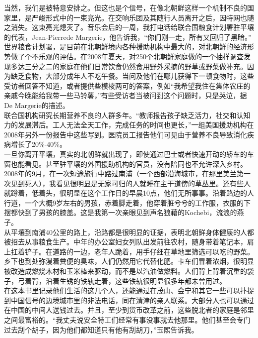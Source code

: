 当然，我们是被特意安排之。但这也是个信号，在像北朝鲜这样一个机制不良的国家里，是严峻形式中的一束亮光。在交响乐团及其随行人员离开之后，因特网也随之消失。这束亮光熄灭了。音乐会后的一周，我打电话给联合国粮食计划署驻平壤的代表，Jean-Pierrede Margerie，他告诉我，“你们刚一走，所有又回归了黑暗。”\\

世界粮食计划署，是目前在北朝鲜境内各种援助机构中最大的，对北朝鲜的经济形势做了个不乐观的评估。在2008年夏天，对250个北朝鲜家庭做的一个抽样调查发现多达三分之二的家庭在他们日常饮食仍然食用野外采摘的野草或野菜做补充。因为缺乏食物，大部分成年人不吃午餐。当问及他们在哪儿获得下一顿食物时，这些受访者回答不知道，或者提供些模棱两可的答案，例如“我希望我住在集体农庄的亲戚今晚能给我带一些马铃薯，”有些受访者当被问到这个问题时，只是哭泣，据De Margerie的描述。\\

联合国机构研究长期营养不良的人群多年。“教师报告孩子缺乏活力，社交和认知力的发展滞后。工人无法全天工作，完成任务的时间也更长，”一组美国援助机构在2008年另外一份报告中这些写到。医院员工报告他们可见由于营养不良导致消化疾病增长了20\%-40\%。\\

一旦你离开平壤，真实的北朝鲜就出现了，即使通过巴士或者快速开动的轿车的车窗也能看见。甚至驻平壤的外国援助机构的官员，没有陪同也不允许深入乡村。2008年的9月，在一次短途旅行中路过南浦（一个西部沿海城市，在那里美兰第一次见到死人），我看见很明显是无家可归的人就睡在主干道傍的草丛里。还有些人就蹲着，低着头，很明显在这个工作日的早晨10点，他们无所事事。沿着路边的人行道，一个大概9岁左右的男孩，赤着脚走着，他穿着脏兮兮的工作服，衣服的下摆都快到了男孩的膝盖。这是我第一次亲眼见到声名狼藉的Kochebi，流浪的燕子。\\

从平壤到南浦40公里的路上，沿路都是很明显的证据，表明北朝鲜身体健康的人都被招去从事粮食生产。中年的办公室妇女列队出发前往农村，随身带着笔记本，肩上扛着铲子。在道路的一边，老年人跪着，用手仔细在草地里筛选可以吃的野菜。乡下也到处弥漫着粪便的臭味，人们仍然用它代替化肥。卡车们冒着浓烟，很明显被改造成燃烧木材和玉米棒来驱动，而不是以汽油做燃料。人们背上背着沉重的袋子，弓着背，沿着生锈的铁轨走着，这些铁轨很明显很多年都未曾用过。\\

在这本书里记录他们生活的这几个人，还能通过在茂山、会宁和其它一些可以扑捉到中国信号的边境城市里的非法电话，同在清津的亲人联系。大部分人也可以通过在中国的中间人送钱过去。并且，至少到货币改革之前，这些脱北者的家庭是邻里之间最富裕的。“我丈夫说安全特工们经常有事没事就去他那里。他们甚至会专门过去刮个胡子，因为他们都知道只有他有刮胡刀，”玉熙告诉我。\\

